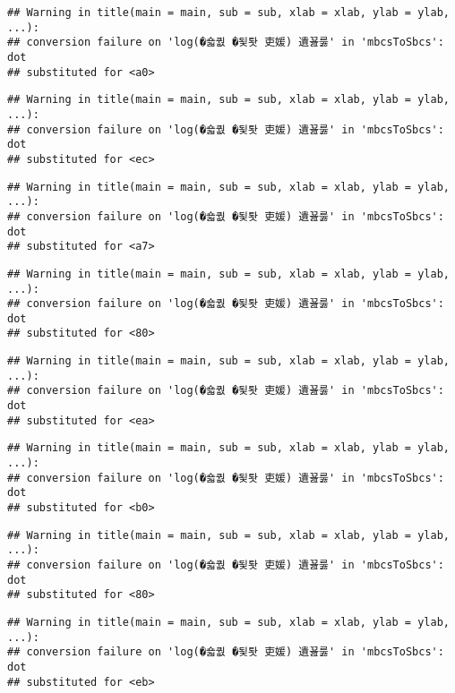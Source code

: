 \documentclass[]{article}
\begin{document}
\begin{verbatim}
## Warning in title(main = main, sub = sub, xlab = xlab, ylab = ylab, ...):
## conversion failure on 'log(�숇퀎 �됯퇏 吏媛) 遺꾪룷' in 'mbcsToSbcs': dot
## substituted for <a0>
\end{verbatim}

\begin{verbatim}
## Warning in title(main = main, sub = sub, xlab = xlab, ylab = ylab, ...):
## conversion failure on 'log(�숇퀎 �됯퇏 吏媛) 遺꾪룷' in 'mbcsToSbcs': dot
## substituted for <ec>
\end{verbatim}

\begin{verbatim}
## Warning in title(main = main, sub = sub, xlab = xlab, ylab = ylab, ...):
## conversion failure on 'log(�숇퀎 �됯퇏 吏媛) 遺꾪룷' in 'mbcsToSbcs': dot
## substituted for <a7>
\end{verbatim}

\begin{verbatim}
## Warning in title(main = main, sub = sub, xlab = xlab, ylab = ylab, ...):
## conversion failure on 'log(�숇퀎 �됯퇏 吏媛) 遺꾪룷' in 'mbcsToSbcs': dot
## substituted for <80>
\end{verbatim}

\begin{verbatim}
## Warning in title(main = main, sub = sub, xlab = xlab, ylab = ylab, ...):
## conversion failure on 'log(�숇퀎 �됯퇏 吏媛) 遺꾪룷' in 'mbcsToSbcs': dot
## substituted for <ea>
\end{verbatim}

\begin{verbatim}
## Warning in title(main = main, sub = sub, xlab = xlab, ylab = ylab, ...):
## conversion failure on 'log(�숇퀎 �됯퇏 吏媛) 遺꾪룷' in 'mbcsToSbcs': dot
## substituted for <b0>
\end{verbatim}

\begin{verbatim}
## Warning in title(main = main, sub = sub, xlab = xlab, ylab = ylab, ...):
## conversion failure on 'log(�숇퀎 �됯퇏 吏媛) 遺꾪룷' in 'mbcsToSbcs': dot
## substituted for <80>
\end{verbatim}

\begin{verbatim}
## Warning in title(main = main, sub = sub, xlab = xlab, ylab = ylab, ...):
## conversion failure on 'log(�숇퀎 �됯퇏 吏媛) 遺꾪룷' in 'mbcsToSbcs': dot
## substituted for <eb>
\end{verbatim}
\end{document}
